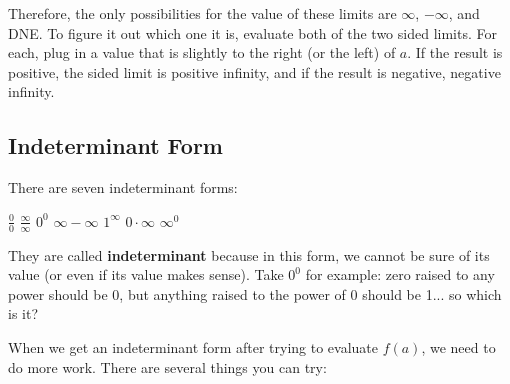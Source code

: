 Therefore, the only possibilities for the value of these limits are $\infty$, $-\infty$, and DNE.  To figure it out which one it is, evaluate both of the two sided limits. For each, plug in a value that is slightly to the right (or the left) of $a$. If the result is positive, the sided limit is positive infinity, and if the result is negative, negative infinity.

\subsection{Indeterminant Form}

There are seven indeterminant forms:

\vspace{1em}

\begin{center}
\begin{Large}
\phantom{}\hfill
$\frac{0}{0}$ \hfill
$\frac{\infty}{\infty}$ \hfill
$0^0$ \hfill
$\infty{-}\infty$ \hfill
$1^\infty$ \hfill
$0{\cdot}\infty$ \hfill
$\infty^0$
\hfill\phantom{}
\end{Large}
\end{center}

\vspace{1em}

They are called \textbf{indeterminant} because in this form, we cannot be sure of its value (or even if its value makes sense). Take $0^0$ for example: zero raised to any power should be 0, but anything raised to the power of $0$ should be 1... so which is it? 

When we get an indeterminant form after trying to evaluate $f(a)$, we need to do more work. There are several things you can try:

